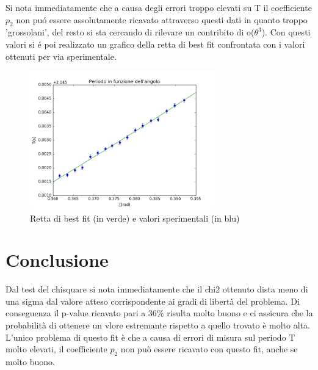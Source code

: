\documentclass{article}
\begin{document}
Si nota immediatamente che a causa degli errori troppo elevati su T il coefficiente $p_2$ non pu\'o essere assolutamente ricavato attraverso questi dati in quanto troppo 'grossolani', del resto si sta cercando di rilevare un contribito di o($\theta^3$). 
Con questi valori si \'e poi realizzato un grafico della retta di best fit confrontata con i valori ottenuti per via sperimentale.


\begin{figure}[!htb]
\begin{center}
\includegraphics[width=8cm]{figura}
\end{center}
\caption{Retta di best fit (in verde) e valori sperimentali (in blu)}
\label{fig1}
\end{figure}




\section{Conclusione}
Dal test del chisquare si nota immediatamente che il chi2 ottenuto dista meno di una sigma dal valore atteso corrispondente ai gradi di libertà del problema.
Di conseguenza il p-value ricavato pari a $36$\% risulta molto buono e ci assicura che la probabilità di ottenere un vlore estremante rispetto a quello trovato è molto alta.
L'unico problema di questo fit è che a causa di errori di misura sul periodo T molto elevati, il coefficiente $p_2$ non può essere ricavato con questo fit, anche se molto buono.
\end{document}
